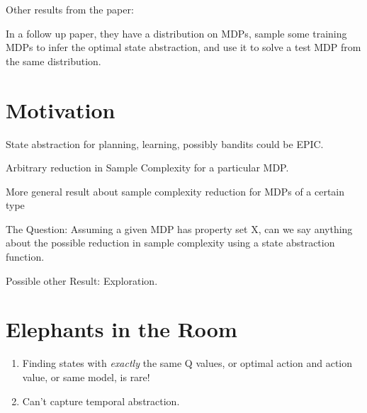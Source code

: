 \documentclass[11pt]{amsart}
\begin{document}
Other results from the paper:





In a follow up paper, they have a distribution on MDPs, sample some training MDPs to infer the optimal state abstraction, and use it to solve a test MDP from the same distribution.



\newpage
\section{Motivation}

 State abstraction for planning, learning, possibly bandits could be EPIC.

 Arbitrary reduction in Sample Complexity for a particular MDP.

 More general result about sample complexity reduction for MDPs of a certain type


The Question: Assuming a given MDP has property set X, can we say anything about the possible reduction in sample complexity using a state abstraction function.


Possible other Result: Exploration.



\section{Elephants in the Room}

\begin{enumerate}
\item Finding states with {\it exactly} the same Q values, or optimal action and action value, or same model, is rare!
\item Can't capture temporal abstraction.
\end{enumerate}
\end{document}
